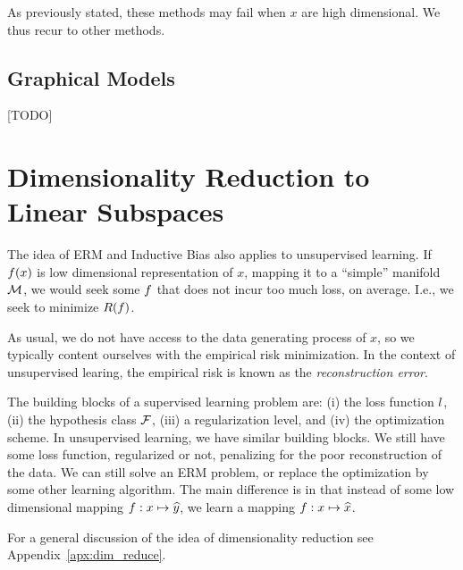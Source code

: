 As previously stated, these methods may fail when $x$ are high dimensional. We thus recur to other methods.



\subsection{Graphical Models}
\label{sec:graphical_model}
[TODO]

















\section{Dimensionality Reduction to Linear Subspaces}
\label{sec:dim_reduce_linear}

The idea of ERM and Inductive Bias also applies to unsupervised learning.
If $f(x)$ is low dimensional representation of $x$, mapping it to a ``simple'' manifold $\mathcal{M}$, we would seek some $f$ that does not incur too much loss, on average. I.e., we seek to minimize $R(f)$.

As usual, we do not have access to the data generating process of $x$, so we typically content ourselves with the empirical risk minimization.
In the context of unsupervised learing, the empirical risk is known as the \emph{reconstruction error}.

The building blocks of a supervised learning problem are: 
(i) the loss function $l$,
(ii) the hypothesis class $\mathcal{F}$, 
(iii) a regularization level, and
(iv) the optimization scheme.
In unsupervised learning, we have similar building blocks. We still have some loss function, regularized or not, penalizing for the poor reconstruction of the data. We can still solve an ERM problem, or replace the optimization by some other learning algorithm. The main difference is in that instead of some low dimensional mapping $f:x \mapsto \widehat{y}$, we learn a mapping  $f:x \mapsto \widehat{x}$.


For a general discussion of the idea of dimensionality reduction see Appendix~\ref{apx:dim_reduce}.





